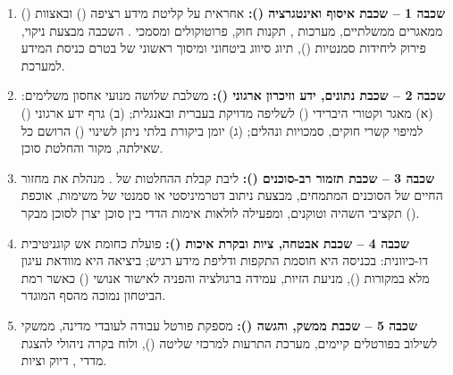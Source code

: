 \begin{enumerate}[leftmargin=1.8em]
  \item \textbf{שכבה 1 -- שכבת איסוף ואינטגרציה ():}
  אחראית על קליטת מידע רציפה () ובאצוות () ממאגרים ממשלתיים, מערכות , תקנות חוק, פרוטוקולים ומסמכי . השכבה מבצעת ניקוי, פירוק ליחידות סמנטיות (), תיוג סיווג ביטחוני ומיסוך ראשוני של  בטרם כניסת המידע למערכת.

  \item \textbf{שכבה 2 -- שכבת נתונים, ידע וזיכרון ארגוני ():}
  משלבת שלושה מנועי אחסון משלימים: (א) מאגר וקטורי היברידי () לשליפה מדויקת בעברית ובאנגלית; (ב) גרף ידע ארגוני () למיפוי קשרי חוקים, סמכויות ונהלים; (ג) יומן ביקורת בלתי ניתן לשינוי () הרושם כל שאילתה, מקור והחלטת סוכן.

  \item \textbf{שכבה 3 -- שכבת תזמור רב-סוכנים ():}
  ליבת קבלת ההחלטות של . מנהלת את מחזור החיים של הסוכנים המתמחים, מבצעת ניתוב דטרמיניסטי או סמנטי של משימות, אוכפת תקציבי השהיה וטוקנים, ומפעילה לולאות אימות הדדי בין סוכן יצרן לסוכן מבקר ().

  \item \textbf{שכבה 4 -- שכבת אבטחה, ציות ובקרת איכות ():}
  פועלת כחומת אש קוגניטיבית דו-כיוונית: בכניסה היא חוסמת התקפות  ודליפת מידע רגיש; ביציאה היא מוודאת עיגון מלא במקורות (), מניעת הזיות, עמידה ברגולציה והפניה לאישור אנושי () כאשר רמת הביטחון נמוכה מהסף המוגדר.

  \item \textbf{שכבה 5 -- שכבת ממשק,  והגשה ():}
  מספקת פורטל עבודה לעובדי מדינה, ממשקי  לשילוב בפורטלים קיימים, מערכת התרעות למרכזי שליטה (), ולוח בקרה ניהולי להצגת מדדי , דיוק וציות.
\end{enumerate}

